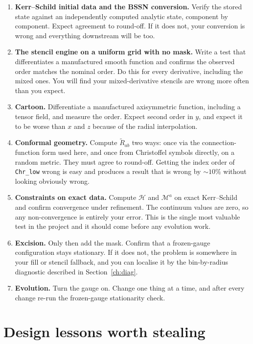 \documentclass[11pt,openany]{book}
\begin{document}
\begin{enumerate}
\item \textbf{Kerr--Schild initial data and the BSSN conversion.} Verify the
      stored state against an independently computed analytic state,
      component by component. Expect agreement to round-off. If it does not,
      your conversion is wrong and everything downstream will be too.
\item \textbf{The stencil engine on a uniform grid with no mask.} Write a test
      that differentiates a manufactured smooth function and confirms the
      observed order matches the nominal order. Do this for every derivative,
      including the mixed ones. You will find your mixed-derivative stencils
      are wrong more often than you expect.
\item \textbf{Cartoon.} Differentiate a manufactured axisymmetric function,
      including a tensor field, and measure the order. Expect second order in
      $y$, and expect it to be worse than $x$ and $z$ because of the radial
      interpolation.
\item \textbf{Conformal geometry.} Compute $\tilde{R}_{ab}$ two ways: once via
      the connection-function form used here, and once from Christoffel symbols
      directly, on a random metric. They must agree to round-off. Getting the
      index order of \texttt{Chr\_low} wrong is easy and produces a result that
      is wrong by $\sim 10\%$ without looking obviously wrong.
\item \textbf{Constraints on exact data.} Compute $\mathcal{H}$ and
      $\mathcal{M}^a$ on exact Kerr--Schild and confirm convergence under
      refinement. The continuum values are zero, so any non-convergence is
      entirely your error. This is the single most valuable test in the
      project and it should come before any evolution work.
\item \textbf{Excision.} Only then add the mask. Confirm that a frozen-gauge
      configuration stays stationary. If it does not, the problem is
      somewhere in your fill or stencil fallback, and you can localise it by
      the bin-by-radius diagnostic described in Section~\ref{ch:diag}.
\item \textbf{Evolution.} Turn the gauge on. Change one thing at a time, and
      after every change re-run the frozen-gauge stationarity check.
\end{enumerate}

\section{Design lessons worth stealing}
\end{document}
